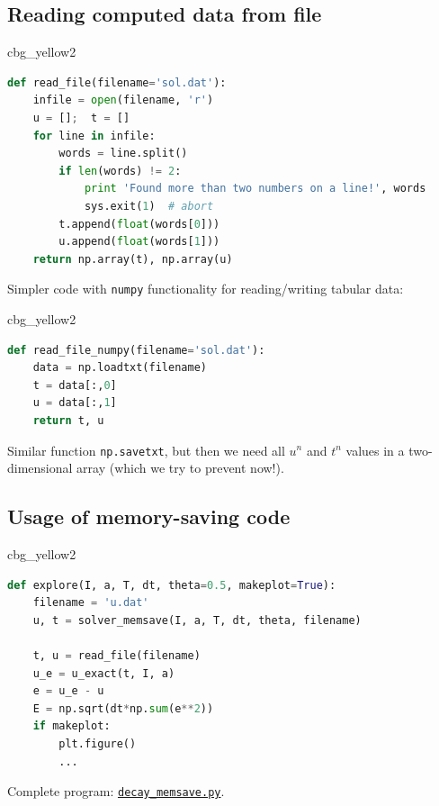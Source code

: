 \documentclass[%
oneside,                 %
final,                   %
10pt]{article}
\newenvironment{_cod_tight}[1]{
   \def\FrameCommand{\colorbox{#1}}
   \FrameRule0.6pt\MakeFramed {\FrameRestore}\vskip3mm}
   {\vskip0mm\endMakeFramed}
\newenvironment{cod}[1]{
\bgroup\rmfamily
\fboxsep=0mm\relax
\begin{_cod_tight}{#1}
\list{}{\parsep=-2mm\parskip=0mm\topsep=0pt\leftmargin=2mm
\rightmargin=2\leftmargin\leftmargin=4pt\relax}
\item\relax}
{\endlist\end{_cod_tight}\egroup}
\begin{document}
\subsection*{Reading computed data from file}

\begin{cod}{cbg_yellow2}\begin{lstlisting}[language=Python,style=simple,xleftmargin=2mm]
def read_file(filename='sol.dat'):
    infile = open(filename, 'r')
    u = [];  t = []
    for line in infile:
        words = line.split()
        if len(words) != 2:
            print 'Found more than two numbers on a line!', words
            sys.exit(1)  # abort
        t.append(float(words[0]))
        u.append(float(words[1]))
    return np.array(t), np.array(u)
\end{lstlisting}\end{cod}
\noindent

Simpler code with \texttt{numpy} functionality for reading/writing tabular data:

\begin{cod}{cbg_yellow2}\begin{lstlisting}[language=Python,style=simple,xleftmargin=2mm]
def read_file_numpy(filename='sol.dat'):
    data = np.loadtxt(filename)
    t = data[:,0]
    u = data[:,1]
    return t, u
\end{lstlisting}\end{cod}
\noindent

Similar function \texttt{np.savetxt}, but then we need all $u^n$ and $t^n$ values
in a two-dimensional array (which we try to prevent now!).

\subsection*{Usage of memory-saving code}

\begin{cod}{cbg_yellow2}\begin{lstlisting}[language=Python,style=simple,xleftmargin=2mm]
def explore(I, a, T, dt, theta=0.5, makeplot=True):
    filename = 'u.dat'
    u, t = solver_memsave(I, a, T, dt, theta, filename)

    t, u = read_file(filename)
    u_e = u_exact(t, I, a)
    e = u_e - u
    E = np.sqrt(dt*np.sum(e**2))
    if makeplot:
        plt.figure()
        ...
\end{lstlisting}\end{cod}
\noindent

Complete program: \href{{http://tinyurl.com/ofkw6kc/alg/decay_memsave.py}}{\nolinkurl{decay_memsave.py}}.


\cleardoublepage{}  %
\printindex
\end{document}
